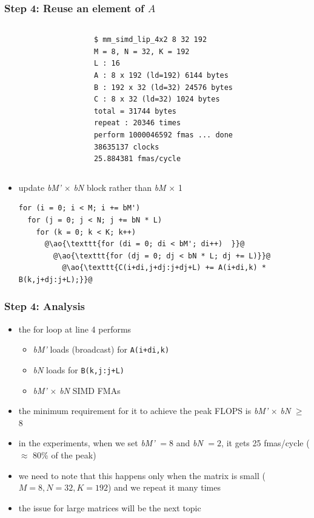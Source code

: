 \documentclass[12pt,dvipdfmx]{beamer}
\newcommand{\ao}[1]{{\color{blue}#1}}
\begin{document}
\begin{frame}[fragile]
\frametitle{Step 4: Reuse an element of $A$}
\begin{columns}
  \begin{column}{0.55\textwidth}
\begin{center}
\def\svgwidth{0.8\textwidth}
{\scriptsize }%
\end{center}
  \end{column}
  \begin{column}{0.4\textwidth}
    \begin{lstlisting}
$ mm_simd_lip_4x2 8 32 192
M = 8, N = 32, K = 192
L : 16
A : 8 x 192 (ld=192) 6144 bytes
B : 192 x 32 (ld=32) 24576 bytes
C : 8 x 32 (ld=32) 1024 bytes
total = 31744 bytes
repeat : 20346 times
perform 1000046592 fmas ... done
38635137 clocks
25.884381 fmas/cycle
    \end{lstlisting} %
  \end{column}
\end{columns}
\begin{itemize}
\item update {\it bM'} $\times$ {\it bN} block rather than
  {\it bM} $\times$ 1 
\begin{lstlisting}
for (i = 0; i < M; i += bM')  
  for (j = 0; j < N; j += bN * L)  
    for (k = 0; k < K; k++)  
      @\ao{\texttt{for (di = 0; di < bM'; di++)  }}@
        @\ao{\texttt{for (dj = 0; dj < bN * L; dj += L)}}@
          @\ao{\texttt{C(i+di,j+dj:j+dj+L) += A(i+di,k) * B(k,j+dj:j+L);}}@
\end{lstlisting}
\end{itemize}
\end{frame}


\begin{frame}
\frametitle{Step 4: Analysis}
\begin{itemize}
\item the for loop at line 4 performs
  \begin{itemize}
  \item \ao{\it bM'} loads (broadcast) for {\tt A(i+di,k)}
  \item \ao{\it bN} loads for {\tt B(k,j:j+L)}
  \item \ao{\it bM'} $\times$ \ao{\it bN} SIMD FMAs
  \end{itemize}
  
\item the minimum requirement for it to achieve the peak FLOPS is
  \ao{\it bM'} $\times$ \ao{\it bN} $\geq$ 8
\item in the experiments, when we set {\it bM'} $= 8$ and {\it bN} $= 2$, it gets
  \ao{25} fmas/cycle ($\approx$ \ao{80\%} of the peak)
\item we need to note that this happens only when the matrix is small
  ($M = 8, N = 32, K = 192$) and we repeat it many times
\item the issue for large matrices will be the next topic
\end{itemize}

\end{frame}
\end{document}
